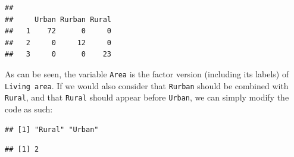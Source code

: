 \documentclass[
]{book}
\newenvironment{Shaded}{\begin{snugshade}}{\end{snugshade}}
\newcommand{\AttributeTok}[1]{\textcolor[rgb]{0.77,0.63,0.00}{#1}}
\newcommand{\DecValTok}[1]{\textcolor[rgb]{0.00,0.00,0.81}{#1}}
\newcommand{\FunctionTok}[1]{\textcolor[rgb]{0.00,0.00,0.00}{#1}}
\newcommand{\NormalTok}[1]{#1}
\newcommand{\OtherTok}[1]{\textcolor[rgb]{0.56,0.35,0.01}{#1}}
\newcommand{\SpecialCharTok}[1]{\textcolor[rgb]{0.00,0.00,0.00}{#1}}
\newcommand{\StringTok}[1]{\textcolor[rgb]{0.31,0.60,0.02}{#1}}
\begin{document}
\begin{verbatim}
##    
##     Urban Rurban Rural
##   1    72      0     0
##   2     0     12     0
##   3     0      0    23
\end{verbatim}

As can be seen, the variable \texttt{Area} is the factor version (including its labels) of \texttt{Living\ area}.
If we would also consider that \texttt{Rurban} should be combined with \texttt{Rural}, and that \texttt{Rural} should appear before \texttt{Urban}, we can simply modify the code as such:

\begin{Shaded}
\end{Shaded}

\begin{verbatim}
## [1] "Rural" "Urban"
\end{verbatim}

\begin{Shaded}
\end{Shaded}

\begin{verbatim}
## [1] 2
\end{verbatim}

\begin{Shaded}
\end{Shaded}
\end{document}
